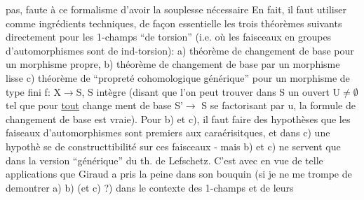  pas, faute  à ce formalisme d'avoir la souplesse nécessaire
En fait, il faut utiliser comme ingrédients techniques, de façon essentielle\hand{,}
les trois théorèmes suivants directement pour les 1-champs ``de torsion''
(i.e. où les faisceaux en groupes d'automorphismes sont de ind-torsion):
a) théorème de changement de base pour un morphisme propre, b) théorème de
changement de base par un morphisme lisse  c) théorème de  ``propreté
cohomologique générique'' pour un morphisme de type fini f: X$\to$S, S intègre
(disant que l'on peut trouver dans S un ouvert U$\neq\emptyset$ tel que pour \uline{tout} change
ment de base S'$\to$ S se factorisant par u, la formule de changement de base
est vraie). \hand{(}Pour b) et c), il faut faire des hypothèses que les faiseaux
d'automorphismes sont premiers aux caraérisitques, et dans c) une hypothè
se de constructtibilité sur ces faisceaux - mais b) et c) ne servent que
dans la version ``générique'' du th. de Lefschetz.\hand{)} C'est avec en vue de telle
applications que Giraud a pris la peine dans son bouquin (si je ne me trompe\hand{)}
de demontrer a)\hand{,} b) (et c) ?) dans le contexte des 1-champs et de leurs

